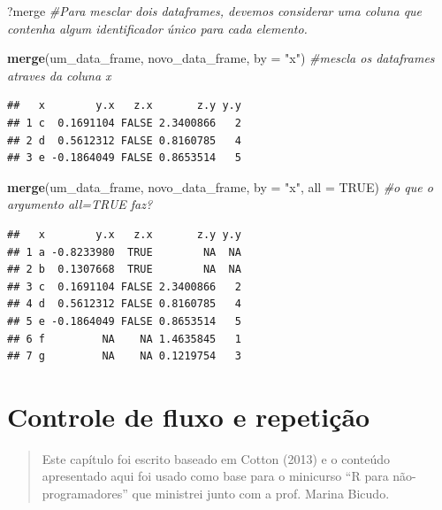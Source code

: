 \documentclass[
]{book}
\newenvironment{Shaded}{\begin{snugshade}}{\end{snugshade}}
\newcommand{\AttributeTok}[1]{\textcolor[rgb]{0.13,0.29,0.53}{#1}}
\newcommand{\CommentTok}[1]{\textcolor[rgb]{0.56,0.35,0.01}{\textit{#1}}}
\newcommand{\ConstantTok}[1]{\textcolor[rgb]{0.56,0.35,0.01}{#1}}
\newcommand{\FunctionTok}[1]{\textcolor[rgb]{0.13,0.29,0.53}{\textbf{#1}}}
\newcommand{\NormalTok}[1]{#1}
\newcommand{\StringTok}[1]{\textcolor[rgb]{0.31,0.60,0.02}{#1}}
\begin{document}
\begin{Shaded}
\begin{Highlighting}[]
\NormalTok{?merge }\CommentTok{\#Para mesclar dois dataframes, devemos considerar uma coluna que contenha algum identificador único para cada elemento.}
\end{Highlighting}
\end{Shaded}

\begin{Shaded}
\begin{Highlighting}[]
\FunctionTok{merge}\NormalTok{(um\_data\_frame, novo\_data\_frame, }\AttributeTok{by =} \StringTok{"x"}\NormalTok{)  }\CommentTok{\#mescla os dataframes atraves da coluna \textquotesingle{}x\textquotesingle{}}
\end{Highlighting}
\end{Shaded}

\begin{verbatim}
##   x        y.x   z.x       z.y y.y
## 1 c  0.1691104 FALSE 2.3400866   2
## 2 d  0.5612312 FALSE 0.8160785   4
## 3 e -0.1864049 FALSE 0.8653514   5
\end{verbatim}

\begin{Shaded}
\begin{Highlighting}[]
\FunctionTok{merge}\NormalTok{(um\_data\_frame, novo\_data\_frame, }\AttributeTok{by =} \StringTok{"x"}\NormalTok{, }\AttributeTok{all =} \ConstantTok{TRUE}\NormalTok{) }\CommentTok{\#o que o argumento all=TRUE faz?}
\end{Highlighting}
\end{Shaded}

\begin{verbatim}
##   x        y.x   z.x       z.y y.y
## 1 a -0.8233980  TRUE        NA  NA
## 2 b  0.1307668  TRUE        NA  NA
## 3 c  0.1691104 FALSE 2.3400866   2
## 4 d  0.5612312 FALSE 0.8160785   4
## 5 e -0.1864049 FALSE 0.8653514   5
## 6 f         NA    NA 1.4635845   1
## 7 g         NA    NA 0.1219754   3
\end{verbatim}

\chapter{Controle de fluxo e repetição}\label{controle-de-fluxo-e-repetiuxe7uxe3o}

\begin{quote}
Este capítulo foi escrito baseado em Cotton (2013) e o conteúdo apresentado aqui foi usado como base para o minicurso ``R para não-programadores'' que ministrei junto com a prof. Marina Bicudo.
\end{quote}
\end{document}
